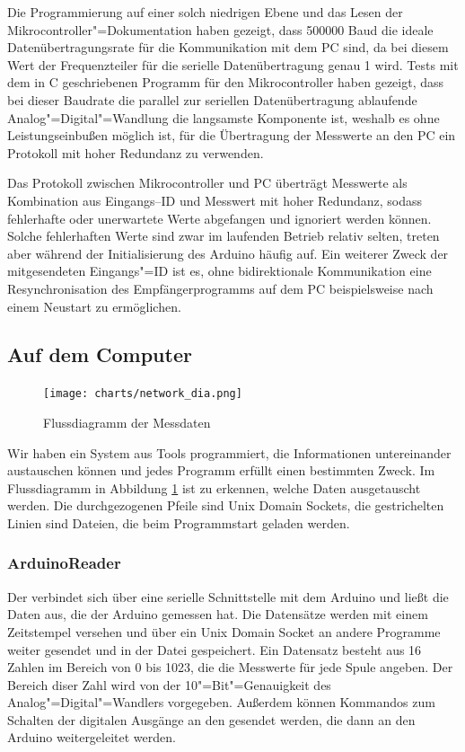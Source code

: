 Die Programmierung auf einer solch niedrigen Ebene und das Lesen der Mikrocontroller"=Dokumentation
haben gezeigt, dass 500000 Baud die ideale Datenübertragungsrate für die Kommunikation mit dem PC
sind, da bei diesem Wert der Frequenzteiler für die serielle Datenübertragung genau 1 wird.
Tests mit dem in C geschriebenen Programm für den Mikrocontroller haben gezeigt, dass bei
dieser Baudrate die
parallel zur seriellen Datenübertragung ablaufende Analog"=Digital"=Wandlung die langsamste
Komponente ist, weshalb es ohne Leistungseinbußen möglich ist, für die Übertragung
der Messwerte an den PC ein Protokoll mit hoher Redundanz zu verwenden.

Das Protokoll zwischen Mikrocontroller und PC überträgt Messwerte als Kombination aus
Eingangs--ID und Messwert mit hoher Redundanz, sodass fehlerhafte oder
unerwartete Werte abgefangen und
ignoriert werden können. Solche fehlerhaften Werte sind zwar im laufenden Betrieb relativ selten,
treten aber während der Initialisierung des Arduino häufig auf. Ein weiterer Zweck der
mitgesendeten Eingangs"=ID ist es, ohne bidirektionale Kommunikation eine Resynchronisation des
Empfängerprogramms auf dem PC beispielsweise nach einem Neustart zu ermöglichen.

\subsection{Auf dem Computer}

\begin{figure}
  \texttt{[image: charts/network\_dia.png]}
  \caption{Flussdiagramm der Messdaten}
  \label{fig:network}
\end{figure}

Wir haben ein System aus Tools programmiert, die Informationen untereinander austauschen können und jedes Programm erfüllt einen bestimmten Zweck.
Im Flussdiagramm in Abbildung \ref{fig:network} ist zu erkennen, welche Daten ausgetauscht werden.
Die durchgezogenen Pfeile sind Unix Domain Sockets, die gestrichelten Linien sind Dateien, die beim Programmstart geladen werden.

\subsubsection{ArduinoReader}
Der  verbindet sich über eine serielle Schnittstelle mit dem Arduino und ließt die Daten aus, die der Arduino gemessen hat.
Die Datensätze werden mit einem Zeitstempel versehen und über ein Unix Domain Socket an andere Programme weiter gesendet und in der Datei  gespeichert.
Ein Datensatz besteht aus 16 Zahlen im Bereich von 0 bis 1023, die die Messwerte für jede Spule angeben.
Der Bereich diser Zahl wird von der 10"=Bit"=Genauigkeit des Analog"=Digital"=Wandlers vorgegeben.
Außerdem können Kommandos zum Schalten der digitalen Ausgänge an den  gesendet werden, die dann an den Arduino weitergeleitet werden.


